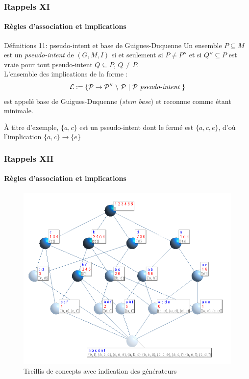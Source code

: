 \documentclass[french]{beamer}
\begin{document}
\begin{frame}
\frametitle{Rappels XI}
\framesubtitle{Règles d'association et implications}
\begin{block}{Définitions 11: pseudo-intent et base de Guigues-Duquenne}
Un ensemble $P \subseteq M$ est un \emph{pseudo-intent} de $(G, M, I)$ 
si et seulement si $P \neq P''$ et si $Q'' \subseteq P$ est vraie pour tout pseudo-intent $Q \subseteq P$, $Q \ne P.$ \\
L'ensemble des implications de la forme :
$$\cal{L} := \{ P \rightarrow P''\ \backslash\ P\ |\ P\ \textit{pseudo-intent}\ \}$$
est appelé base de Guigues-Duquenne (\emph{stem base}) et reconnue comme étant minimale.
\end{block}
À titre d'exemple, $\{a, c\}$ est un pseudo-intent dont le fermé est $\{a, c, e\}$, d'où l'implication $\{a, c\} \rightarrow \{e\}$
\end{frame}

\begin{frame}
\frametitle{Rappels XII}
\framesubtitle{Règles d'association et implications}
\begin{figure}[H]
\label{cap:fig:treillis-gen}
\begin{center}\includegraphics[scale=0.36]{figures/Treillis21FullLabelGen.png}\end{center}
\caption{Treillis de concepts avec indication des générateurs}
\end{figure}
\end{frame}
\end{document}
